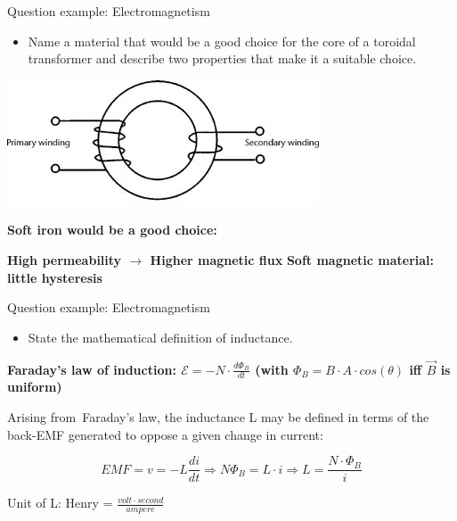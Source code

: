 \documentclass[compress]{beamer}
\begin{document}
\begin{frame}{Question example: Electromagnetism}

    \begin{itemize}
        \item Name a material that would be a good choice
            for the core of a toroidal transformer and describe two properties
            that make it a suitable choice.
    \end{itemize}

    \begin{center}
        \includegraphics[width=0.6\linewidth]{toroidal-transformer}
    \end{center}
    \textbf{Soft iron would be a good choice:}

    \textbf{High permeability $\rightarrow$ Higher magnetic flux}
    \textbf{Soft magnetic material: little hysteresis}
   
\end{frame}

\begin{frame}{Question example: Electromagnetism}

    \begin{itemize}
        \item State the mathematical definition of inductance.
    \end{itemize}
    
    \textbf{Faraday's law of induction: $\displaystyle\mathcal{E} = - N \cdot
            \frac{d\Phi_B}{dt}$ (with $\Phi_B = B\cdot A \cdot cos(\theta)$ iff
            $\vec{B}$ is uniform)}

Arising from Faraday's law, the inductance L may be defined in terms of the
    back-EMF generated to oppose a given change in current:

    \[
        EMF = v = -L\frac{di}{dt}
        \Rightarrow N\Phi_B = L\cdot i
        \Rightarrow L = \frac{N \cdot \Phi_B}{i}
    \]

Unit of L: Henry = $\frac{volt \cdot second}{ampere}$ 

\end{frame}
\end{document}
